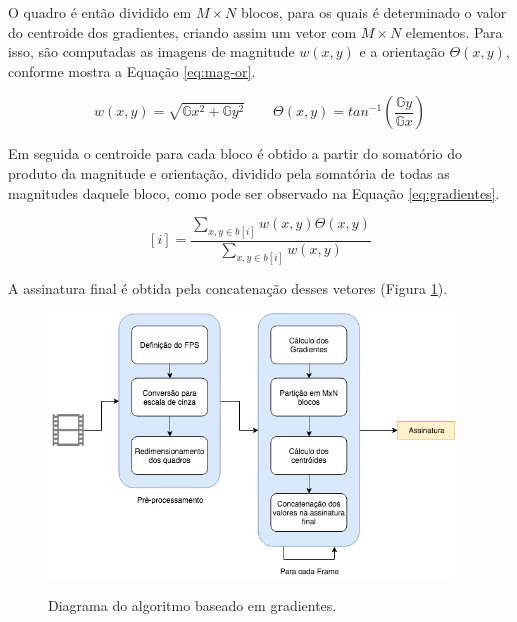 	O quadro é então dividido em $M\times N$ blocos, para os quais é determinado o valor do centroide dos gradientes, criando assim um vetor com $M \times N$ elementos. Para isso, são computadas as imagens de magnitude \textit{$w(x,y)$} e a orientação \textit{$\Theta(x,y)$}, conforme mostra a Equação \ref{eq:mag-or}.
    
\begin{equation}
	\label{eq:mag-or}
    w(x,y) = \sqrt{\mathbb{G}x^{2} + \mathbb{G}y^{2}}
\qquad
\Theta(x,y) = tan^{-1}\left (\frac{\mathbb{G}y}{\mathbb{G}x} \right)
\end{equation}
    
    Em seguida o centroide para cada bloco é obtido a partir do somatório do produto da magnitude e orientação, dividido pela somatória de todas as magnitudes daquele bloco, como pode ser observado na Equação \ref{eq:gradientes}.
    
\begin{equation}
	\label{eq:gradientes}
	[i] = \frac{\sum_{x,y \in b[i]} w(x,y)\Theta (x,y)}{\sum_{x,y \in b[i]} w(x,y)}
\end{equation}

A assinatura final é obtida pela concatenação desses vetores (Figura \ref{fig:dia_gradiente}).

 \begin{figure}[h]
      \centering
      \caption{Diagrama do algoritmo baseado em gradientes.}
      \includegraphics[width=0.96\textwidth]{dados/figuras/diagramas/Diag-Gradiente}
       	\label{fig:dia_gradiente}
    \end{figure}  
    
%
%

